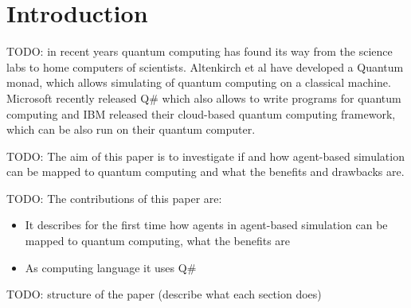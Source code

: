 \section{Introduction}
TODO: in recent years quantum computing has found its way from the science labs to home computers of scientists. Altenkirch et al have developed a Quantum monad, which allows simulating of quantum computing on a classical machine. Microsoft recently released Q\# which also allows to write programs for quantum computing and IBM released their cloud-based quantum computing framework, which can be also run on their quantum computer.

TODO: The aim of this paper is to investigate if and how agent-based simulation can be mapped to quantum computing and what the benefits and drawbacks are.

TODO: The contributions of this paper are:

\begin{itemize}
	\item It describes for the first time how agents in agent-based simulation can be mapped to quantum computing, what the benefits are
	\item As computing language it uses Q\#
\end{itemize}

TODO: structure of the paper (describe what each section does)